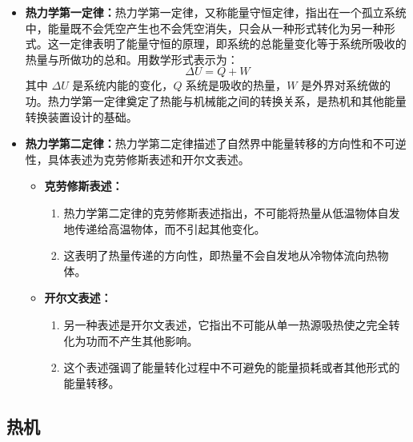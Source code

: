 \documentclass[dvipsnames, svgnames,a4paper,11pt]{article}
\begin{document}
        \begin{itemize}
            \item \textbf{热力学第一定律：}热力学第一定律，又称能量守恒定律，指出在一个孤立系统中，能量既不会凭空产生也不会凭空消失，只会从一种形式转化为另一种形式。这一定律表明了能量守恒的原理，即系统的总能量变化等于系统所吸收的热量与所做功的总和。用数学形式表示为：
            \[
            \Delta U = Q + W
            \]
            其中 $\Delta U$ 是系统内能的变化，$Q$ 系统是吸收的热量，$W$ 是外界对系统做的功。热力学第一定律奠定了热能与机械能之间的转换关系，是热机和其他能量转换装置设计的基础。
            

            \item \textbf{热力学第二定律：}热力学第二定律描述了自然界中能量转移的方向性和不可逆性，具体表述为克劳修斯表述和开尔文表述。

                \begin{itemize}
                    \item \textbf{克劳修斯表述：}
                    \begin{enumerate}
                        \item 热力学第二定律的克劳修斯表述指出，不可能将热量从低温物体自发地传递给高温物体，而不引起其他变化。
                        \item 这表明了热量传递的方向性，即热量不会自发地从冷物体流向热物体。
                    \end{enumerate}
                    
                    \item \textbf{开尔文表述：}
                    \begin{enumerate}
                        \item 另一种表述是开尔文表述，它指出不可能从单一热源吸热使之完全转化为功而不产生其他影响。
                        \item 这个表述强调了能量转化过程中不可避免的能量损耗或者其他形式的能量转移。
                    \end{enumerate}
                \end{itemize}

            

                
        
        \end{itemize}



    
    \subsection{热机}
\end{document}
